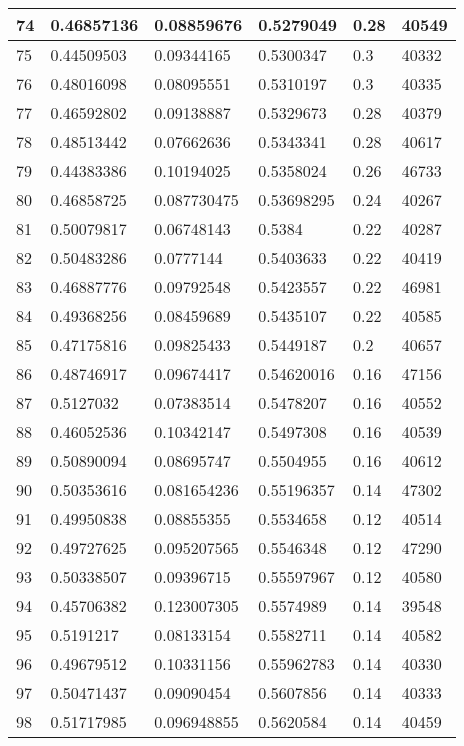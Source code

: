 \begin{longtable}{|l|l|l|l|l|l|}
74 & 0.46857136 & 0.08859676 & 0.5279049 & 0.28 & 40549 \\ \hline 
75 & 0.44509503 & 0.09344165 & 0.5300347 & 0.3 & 40332 \\ \hline 
76 & 0.48016098 & 0.08095551 & 0.5310197 & 0.3 & 40335 \\ \hline 
77 & 0.46592802 & 0.09138887 & 0.5329673 & 0.28 & 40379 \\ \hline 
78 & 0.48513442 & 0.07662636 & 0.5343341 & 0.28 & 40617 \\ \hline 
79 & 0.44383386 & 0.10194025 & 0.5358024 & 0.26 & 46733 \\ \hline 
80 & 0.46858725 & 0.087730475 & 0.53698295 & 0.24 & 40267 \\ \hline 
81 & 0.50079817 & 0.06748143 & 0.5384 & 0.22 & 40287 \\ \hline 
82 & 0.50483286 & 0.0777144 & 0.5403633 & 0.22 & 40419 \\ \hline 
83 & 0.46887776 & 0.09792548 & 0.5423557 & 0.22 & 46981 \\ \hline 
84 & 0.49368256 & 0.08459689 & 0.5435107 & 0.22 & 40585 \\ \hline 
85 & 0.47175816 & 0.09825433 & 0.5449187 & 0.2 & 40657 \\ \hline 
86 & 0.48746917 & 0.09674417 & 0.54620016 & 0.16 & 47156 \\ \hline 
87 & 0.5127032 & 0.07383514 & 0.5478207 & 0.16 & 40552 \\ \hline 
88 & 0.46052536 & 0.10342147 & 0.5497308 & 0.16 & 40539 \\ \hline 
89 & 0.50890094 & 0.08695747 & 0.5504955 & 0.16 & 40612 \\ \hline 
90 & 0.50353616 & 0.081654236 & 0.55196357 & 0.14 & 47302 \\ \hline 
91 & 0.49950838 & 0.08855355 & 0.5534658 & 0.12 & 40514 \\ \hline 
92 & 0.49727625 & 0.095207565 & 0.5546348 & 0.12 & 47290 \\ \hline 
93 & 0.50338507 & 0.09396715 & 0.55597967 & 0.12 & 40580 \\ \hline 
94 & 0.45706382 & 0.123007305 & 0.5574989 & 0.14 & 39548 \\ \hline 
95 & 0.5191217 & 0.08133154 & 0.5582711 & 0.14 & 40582 \\ \hline 
96 & 0.49679512 & 0.10331156 & 0.55962783 & 0.14 & 40330 \\ \hline 
97 & 0.50471437 & 0.09090454 & 0.5607856 & 0.14 & 40333 \\ \hline 
98 & 0.51717985 & 0.096948855 & 0.5620584 & 0.14 & 40459 \\ \hline 

\end{longtable}
